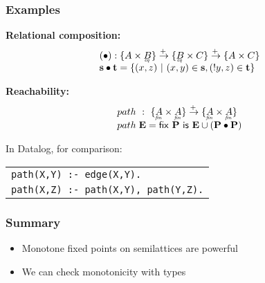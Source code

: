\documentclass{beamer}
\newcommand{\mto}{\overset{+\:}{\to}}
\newcommand{\eq}[1]{\underaccent{\mathit{eq}}{#1}}
\newcommand{\fin}[1]{\underaccent{\mathit{fin}}{#1}}
\newcommand{\m}[1]{\ensuremath{\mathbf{#1}}}
\newcommand{\ms}{\mathsf}
\begin{document}

\begin{frame}
  \frametitle{Examples}

  \textbf{Relational composition:}\vspace{-0.8em}
  \[\begin{array}{l}
    (\bullet) : \{A \times \eq{B}\} \mto \{\eq{B} \times C\} \mto \{A \times C\}\\
    \m{s} \bullet \m{t} =
    \{(x,z) ~|~ (x,y) \in \m{s}, (!y,z) \in \m{t}\}
  \end{array}\]

  \vspace{0.2em}

  \textbf{Reachability:}\vspace{-0.8em}
  \[\begin{array}{l}
    path ~:~ \{\fin{A} \times \fin{A}\} \mto \{\fin{A} \times \fin{A}\}\\
    path\;\m{E} = \ms{fix}~\m{P}~\ms{is}~ \m{E} \cup (\m{P} \bullet \m{P})
  \end{array}\]
  \vspace{0.2em}

  In Datalog, for comparison:
  \begin{tabular}{l}
    \texttt{path(X,Y) :- edge(X,Y).}\\
    \texttt{path(X,Z) :- path(X,Y), path(Y,Z).}\\
  \end{tabular}

\end{frame}


\begin{frame}
  \frametitle{Summary}

  \begin{itemize}
  \item Monotone fixed points on semilattices are powerful
  \item We can check monotonicity with types
  \end{itemize}
\end{frame}
\end{document}
